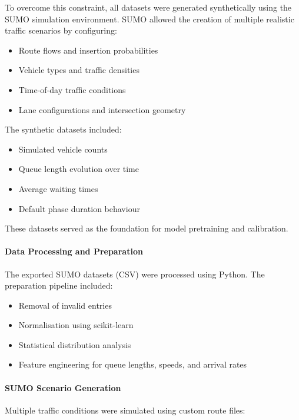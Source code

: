 \documentclass[11pt, a4paper]{report}
\begin{document}
To overcome this constraint, all datasets were generated synthetically using the SUMO simulation environment. SUMO allowed the creation of multiple realistic traffic scenarios by configuring:

\begin{itemize}
    \item Route flows and insertion probabilities
    \item Vehicle types and traffic densities
    \item Time-of-day traffic conditions
    \item Lane configurations and intersection geometry
\end{itemize}

The synthetic datasets included:

\begin{itemize}
    \item Simulated vehicle counts
    \item Queue length evolution over time
    \item Average waiting times
    \item Default phase duration behaviour
\end{itemize}

These datasets served as the foundation for model pretraining and calibration.

\paragraph{Data Processing and Preparation}

The exported SUMO datasets (CSV) were processed using Python. The preparation pipeline included:

\begin{itemize}
    \item Removal of invalid entries
    \item Normalisation using scikit-learn
    \item Statistical distribution analysis
    \item Feature engineering for queue lengths, speeds, and arrival rates
\end{itemize}

\paragraph{SUMO Scenario Generation}

Multiple traffic conditions were simulated using custom route files:
\end{document}
